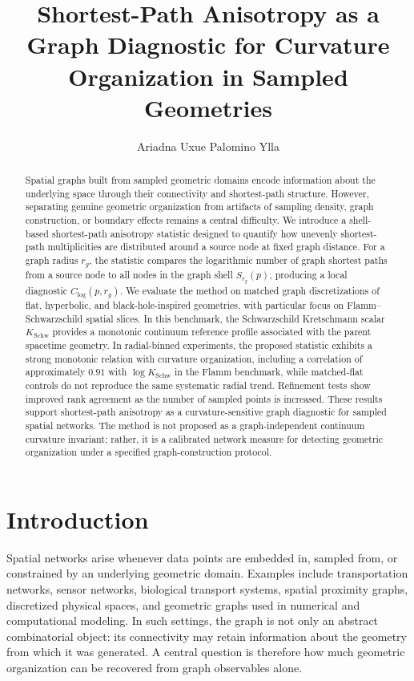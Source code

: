 \documentclass{svproc}
\title{Shortest-Path Anisotropy as a Graph Diagnostic for Curvature Organization in Sampled Geometries}
\author{Ariadna Uxue Palomino Ylla}
\institute{Nagoya University, Nagoya, Japan\\
\email{ariadnauxue@gmail.com}}
\begin{document}
\mainmatter
\maketitle

\begin{abstract}
Spatial graphs built from sampled geometric domains encode information about the underlying space through their connectivity and shortest-path structure. However, separating genuine geometric organization from artifacts of sampling density, graph construction, or boundary effects remains a central difficulty. We introduce a shell-based shortest-path anisotropy statistic designed to quantify how unevenly shortest-path multiplicities are distributed around a source node at fixed graph distance. For a graph radius $r_g$, the statistic compares the logarithmic number of graph shortest paths from a source node to all nodes in the graph shell $S_{r_g}(p)$, producing a local diagnostic $C_{\log}(p,r_g)$. We evaluate the method on matched graph discretizations of flat, hyperbolic, and black-hole-inspired geometries, with particular focus on Flamm--Schwarzschild spatial slices. In this benchmark, the Schwarzschild Kretschmann scalar $K_{\mathrm{Schw}}$ provides a monotonic continuum reference profile associated with the parent spacetime geometry. In radial-binned experiments, the proposed statistic exhibits a strong monotonic relation with curvature organization, including a correlation of approximately $0.91$ with $\log K_{\mathrm{Schw}}$ in the Flamm benchmark, while matched-flat controls do not reproduce the same systematic radial trend. Refinement tests show improved rank agreement as the number of sampled points is increased. These results support shortest-path anisotropy as a curvature-sensitive graph diagnostic for sampled spatial networks. The method is not proposed as a graph-independent continuum curvature invariant; rather, it is a calibrated network measure for detecting geometric organization under a specified graph-construction protocol.

\end{abstract}

\section{Introduction}

Spatial networks arise whenever data points are embedded in, sampled from, or constrained by an underlying geometric domain. Examples include transportation networks, sensor networks, biological transport systems, spatial proximity graphs, discretized physical spaces, and geometric graphs used in numerical and computational modeling. In such settings, the graph is not only an abstract combinatorial object: its connectivity may retain information about the geometry from which it was generated. A central question is therefore how much geometric organization can be recovered from graph observables alone.
\end{document}
